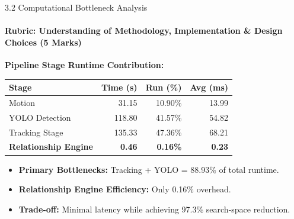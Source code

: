 \documentclass[aspectratio=169, 11pt]{beamer}
\begin{document}
\begin{frame}{3.2 Computational Bottleneck Analysis}
    \framesubtitle{Rubric: Understanding of Methodology, Implementation \& Design Choices (5 Marks)}
    \centering
    \textbf{Pipeline Stage Runtime Contribution:}
    \vspace{0.2cm}
    \begin{table}
        \centering
        \small
        \renewcommand{\arraystretch}{1.1}
        \begin{tabular}{lrrr}
            \toprule
            \textbf{Stage} & \textbf{Time (s)} & \textbf{Run (\%)} & \textbf{Avg (ms)} \\
            \midrule
            Motion & 31.15 & 10.90\% & 13.99 \\
            YOLO Detection & 118.80 & 41.57\% & 54.82 \\
            Tracking Stage & 135.33 & 47.36\% & 68.21 \\
            \textbf{Relationship Engine} & \textbf{0.46} & \textbf{0.16\%} & \textbf{0.23} \\
            \bottomrule
        \end{tabular}
    \end{table}
    \vspace{0.5cm}
    \begin{itemize}
        \item \textbf{Primary Bottlenecks:} Tracking + YOLO = 88.93\% of total runtime.
        \item \textbf{Relationship Engine Efficiency:} Only 0.16\% overhead.
        \item \textbf{Trade-off:} Minimal latency while achieving 97.3\% search-space reduction.
    \end{itemize}
\end{frame}
\end{document}
